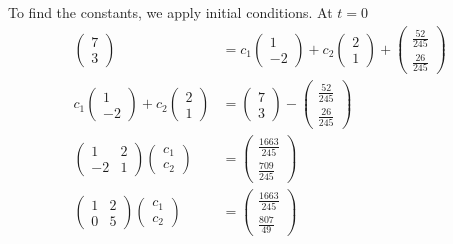 \documentclass[11pt]{book}
\begin{document}
To find the constants, we apply initial conditions. At $t=0$%
\begin{align*}%
\begin{pmatrix}
7\\
3
\end{pmatrix}
& =c_{1}%
\begin{pmatrix}
1\\
-2
\end{pmatrix}
+c_{2}%
\begin{pmatrix}
2\\
1
\end{pmatrix}
+%
\begin{pmatrix}
\frac{52}{245}\\
\frac{26}{245}%
\end{pmatrix}
\\
c_{1}%
\begin{pmatrix}
1\\
-2
\end{pmatrix}
+c_{2}%
\begin{pmatrix}
2\\
1
\end{pmatrix}
& =%
\begin{pmatrix}
7\\
3
\end{pmatrix}
-%
\begin{pmatrix}
\frac{52}{245}\\
\frac{26}{245}%
\end{pmatrix}
\\%
\begin{pmatrix}
1 & 2\\
-2 & 1
\end{pmatrix}%
\begin{pmatrix}
c_{1}\\
c_{2}%
\end{pmatrix}
& =%
\begin{pmatrix}
\frac{1663}{245}\\
\frac{709}{245}%
\end{pmatrix}
\\%
\begin{pmatrix}
1 & 2\\
0 & 5
\end{pmatrix}%
\begin{pmatrix}
c_{1}\\
c_{2}%
\end{pmatrix}
& =%
\begin{pmatrix}
\frac{1663}{245}\\
\frac{807}{49}%
\end{pmatrix}
\end{align*}
\end{document}
